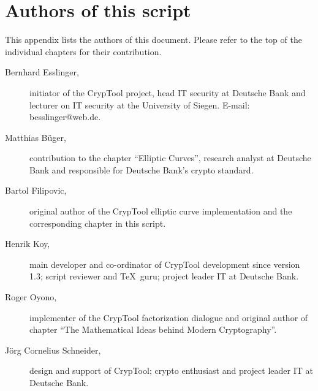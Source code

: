 \section{Authors of this script}
\hypertarget{appendix-authors}{}\label{s:appendix-authors}
This appendix lists the authors of this document. Please refer to the top of the individual
chapters for their contribution.

\begin{description}
\item[Bernhard Esslinger,] initiator of the CrypTool project, head IT security
at Deutsche Bank and lecturer on IT security at the University of Siegen.
E-mail: besslinger@web.de.
 
\item[Matthias B\"uger,] contribution to the chapter ``Elliptic Curves'',
research analyst at Deutsche Bank and responsible for Deutsche Bank's crypto
standard.

\item[Bartol Filipovic,] original author of the CrypTool elliptic curve
implementation and the corresponding chapter in this script.

\item[Henrik Koy, ] main developer and co-ordinator of CrypTool development
since version 1.3; script reviewer and \TeX\ guru; project leader IT at
Deutsche Bank.

\item[Roger Oyono, ] implementer of the CrypTool factorization dialogue and
original author of chapter ``The Mathematical Ideas behind Modern
Cryptography''.

\item[J\"org Cornelius Schneider,] design and support of CrypTool; crypto
enthusiast and project leader IT at Deutsche Bank.

\end{description}


